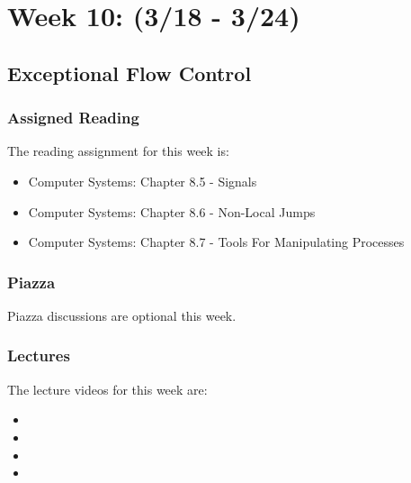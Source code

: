 \clearpage

\renewcommand{\ChapTitle}{Week 10: (3/18 - 3/24)}
\renewcommand{\SectionTitle}{Exceptional Flow Control}

\chapter{\ChapTitle}

\section{\SectionTitle}

\subsection{Assigned Reading}

The reading assignment for this week is:

\begin{itemize}
    \item Computer Systems: Chapter 8.5 - Signals
    \item Computer Systems: Chapter 8.6 - Non-Local Jumps
    \item Computer Systems: Chapter 8.7 - Tools For Manipulating Processes
\end{itemize}

\subsection{Piazza}

Piazza discussions are optional this week. 

\subsection{Lectures}

The lecture videos for this week are:

\begin{itemize}
    \item {}
    \item {}
    \item {}
    \item {}
\end{itemize}

